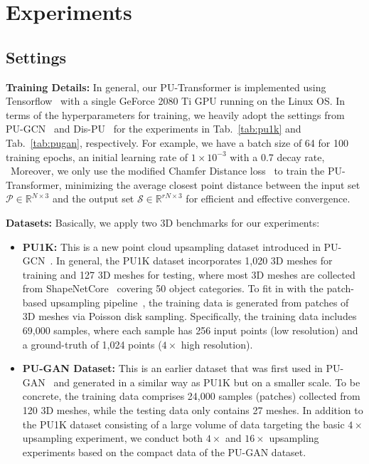 
\section{Experiments}
\subsection{Settings}
\noindent \textbf{Training Details:}
In general, our PU-Transformer is implemented using Tensorflow~\cite{abadi2016tensorflow} with a single GeForce 2080 Ti GPU running on the Linux OS. In terms of the hyperparameters for training, we heavily adopt the settings from PU-GCN~\cite{qian2021pu} and Dis-PU~\cite{li2021point} for the experiments in Tab.~\ref{tab:pu1k} and Tab.~\ref{tab:pugan}, respectively. For example, we have a batch size of 64 for 100 training epochs, an initial learning rate of $1\times10^{-3}$ with a 0.7 decay rate, \etc~Moreover, we only use the modified Chamfer Distance loss~\cite{yifan2019patch} to train the PU-Transformer, minimizing the average closest point distance between the input set $\mathcal{P}\in\mathbb{R}^{N\times3}$ and the output set $\mathcal{S}\in\mathbb{R}^{rN\times3}$ for efficient and effective convergence. 

\noindent \textbf{Datasets:} 
Basically, we apply two 3D benchmarks for our experiments: 
\begin{itemize}
 \item \textbf{PU1K:} 
This is a new point cloud upsampling dataset introduced in PU-GCN~\cite{qian2021pu}. In general, the PU1K dataset incorporates 1,020 3D meshes for training and 127 3D meshes for testing, where most 3D meshes are collected from ShapeNetCore~\cite{chang2015shapenet} covering 50 object categories. To fit in with the patch-based upsampling pipeline~\cite{yifan2019patch}, the training data is generated from patches of 3D meshes via Poisson disk sampling. Specifically, the training data includes 69,000 samples, where each sample has 256 input points (low resolution) and a ground-truth of 1,024 points ($4\times$ high resolution).
 \item \textbf{PU-GAN Dataset:} 
This is an earlier dataset that was first used in PU-GAN~\cite{li2019pu} and generated in a similar way as PU1K but on a smaller scale. To be concrete, the training data comprises 24,000 samples (patches) collected from 120 3D meshes, while the testing data only contains 27 meshes. In addition to the PU1K dataset consisting of a large volume of data targeting the basic $4\times$ upsampling experiment, we conduct both $4\times$ and $16\times$ upsampling experiments based on the compact data of the PU-GAN dataset.

\end{itemize}

